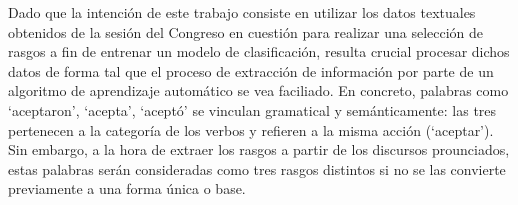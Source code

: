 Dado que la intenci\'on de este trabajo consiste en utilizar los datos textuales
obtenidos de la sesi\'on del Congreso en cuesti\'on para realizar una selecci\'on
de rasgos a fin de entrenar un modelo de clasificaci\'on, resulta crucial procesar dichos
datos de forma tal que el proceso de extracci\'on de informaci\'on por parte
de un algoritmo de aprendizaje autom\'atico se vea faciliado. En concreto, palabras
como `aceptaron', `acepta', `acept\'o' se vinculan gramatical y sem\'anticamente:
las tres pertenecen a la categor\'ia de los verbos y refieren a la misma acci\'on (`aceptar').
Sin embargo, a la hora de extraer los rasgos a partir de los discursos prounciados,
estas palabras ser\'an consideradas como tres rasgos distintos si no se las convierte
previamente a una forma \'unica o base.
\par

